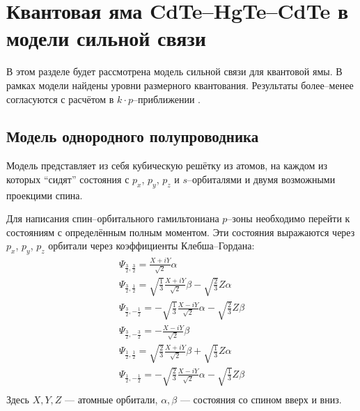 \section{Квантовая яма CdTe--HgTe--CdTe в модели сильной связи}
В этом разделе будет рассмотрена модель сильной связи для квантовой ямы. В рамках модели
найдены уровни размерного квантования. Результаты более--менее согласуются с расчётом в 
$k\cdot p$--приближении \cite{Bernevig2006}.

\subsection{Модель однородного полупроводника}
Модель представляет из себя 
кубическую решётку из атомов, на каждом из которых ``сидят'' состояния
с $p_x$, $p_y$, $p_z$ и $s$--орбиталями и двумя 
возможными проекцими спина.

Для написания
спин--орбитального гамильтониана $p$--зоны необходимо перейти к состояниям с определённым
полным моментом. Эти состояния выражаются через $p_x$, $p_y$, $p_z$ орбитали через
коэффициенты Клебша--Гордана:
\begin{equation}
	\label{transform1}
	\begin{gathered}
        \Psi_{\frac{3}{2},\frac{3}{2}} = \frac{X + iY}{\sqrt{2}}\alpha\\
        \Psi_{\frac{3}{2}, \frac{1}{2}} = \sqrt{\frac{1}{3}}\frac{X + iY}{\sqrt{2}}\beta -
                                         \sqrt{\frac{2}{3}} Z\alpha\\
        \Psi_{\frac{3}{2}, -\frac{1}{2}} = -\sqrt{\frac{1}{3}}\frac{X - iY}{\sqrt{2}}\alpha -
                                         \sqrt{\frac{2}{3}} Z\beta\\
        \Psi_{\frac{3}{2},-\frac{3}{2}} = -\frac{X - iY}{\sqrt{2}}\beta
	\end{gathered}
\end{equation}
\begin{equation}
	\label{transform2}
	\begin{gathered}
        \Psi_{\frac{1}{2}, \frac{1}{2}} = \sqrt{\frac{2}{3}}\frac{X + iY}{\sqrt{2}}\beta +
                                         \sqrt{\frac{1}{3}} Z\alpha\\
        \Psi_{\frac{1}{2}, -\frac{1}{2}} = -\sqrt{\frac{2}{3}}\frac{X - iY}{\sqrt{2}}\alpha-
                                         \sqrt{\frac{1}{3}} Z\beta\\
	\end{gathered}
\end{equation}
Здесь $X,Y,Z$ --- атомные орбитали, $\alpha,\beta$ --- состояния со спином вверх и вниз.

